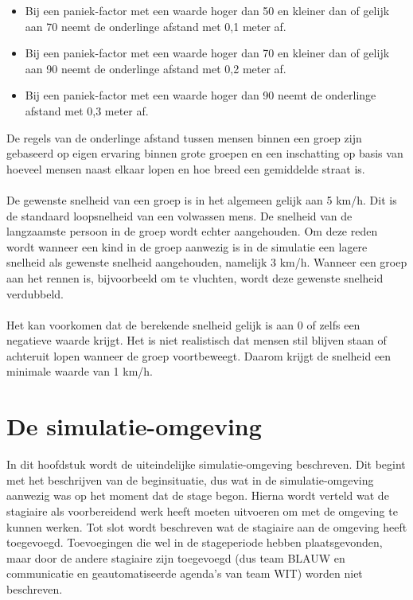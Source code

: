 \documentclass[12pt, letterpaper]{article}
\begin{document}
\begin{itemize}
    \item Bij een paniek-factor met een waarde hoger dan 50 en kleiner dan of gelijk aan 70 neemt de onderlinge afstand met 0,1 meter af.
    \item Bij een paniek-factor met een waarde hoger dan 70 en kleiner dan of gelijk aan 90 neemt de onderlinge afstand met 0,2 meter af.
    \item Bij een paniek-factor met een waarde hoger dan 90 neemt de onderlinge afstand met 0,3 meter af.
\end{itemize}
De regels van de onderlinge afstand tussen mensen binnen een groep zijn gebaseerd op eigen ervaring binnen grote groepen en een inschatting op basis van hoeveel mensen naast elkaar lopen en hoe breed een gemiddelde straat is.
\\ \\
De gewenste snelheid van een groep is in het algemeen gelijk aan 5 km/h. Dit is de standaard loopsnelheid van een volwassen mens. De snelheid van de langzaamste persoon in de groep wordt echter aangehouden. Om deze reden wordt wanneer een kind in de groep aanwezig is in de simulatie een lagere snelheid als gewenste snelheid aangehouden, namelijk 3 km/h.  Wanneer een groep aan het rennen is, bijvoorbeeld om te vluchten, wordt deze gewenste snelheid verdubbeld.
\\ \\
Het kan voorkomen dat de berekende snelheid gelijk is aan 0 of zelfs een negatieve waarde krijgt. Het is niet realistisch dat mensen stil blijven staan of achteruit lopen wanneer de groep voortbeweegt. Daarom krijgt de snelheid een minimale waarde van 1 km/h. 

\newpage
\section{De simulatie-omgeving}\label{simulatie}
In dit hoofdstuk wordt de uiteindelijke simulatie-omgeving beschreven. Dit begint met het beschrijven van de beginsituatie, dus wat in de simulatie-omgeving aanwezig was op het moment dat de stage begon. Hierna wordt verteld wat de stagiaire als voorbereidend werk heeft moeten uitvoeren om met de omgeving te kunnen werken. Tot slot wordt beschreven wat de stagiaire aan de omgeving heeft toegevoegd. Toevoegingen die wel in de stageperiode hebben plaatsgevonden, maar door de andere stagiaire zijn toegevoegd (dus team BLAUW en communicatie en geautomatiseerde agenda's van team WIT) worden niet beschreven.
\end{document}
